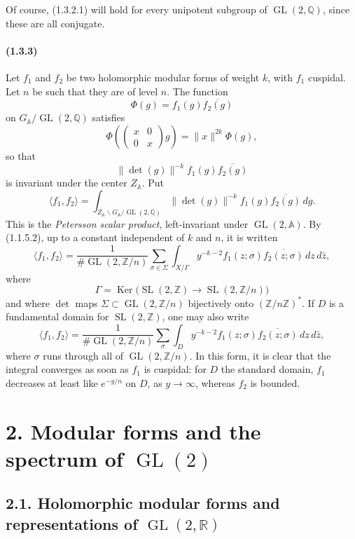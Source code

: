 \documentclass[10pt,a4paper]{article}
\providecommand{\GL}{\operatorname{GL}}
\providecommand{\SL}{\operatorname{SL}}
\providecommand{\Ker}{\operatorname{Ker}}
\providecommand{\R}{\mathbb R}
\providecommand{\Q}{\mathbb Q}
\providecommand{\Z}{\mathbb Z}
\begin{document}
\clearpage
{}
\hypertarget{authority-21}{}
Of course, (1.3.2.1) will hold for every unipotent subgroup of \(\GL(2,\Q)\), since these are all conjugate.

\paragraph{(1.3.3)} Let \(f_1\) and \(f_2\) be two holomorphic modular forms of weight \(k\), with \(f_1\) cuspidal. Let \(n\) be such that they are of level \(n\). The function
\[
\Phi(g)=f_1(g)\overline{f_2(g)}
\]
on \(G_{\mathbb A}/\GL(2,\Q)\) satisfies
\[
\Phi\!\left(\begin{pmatrix}x&0\\0&x\end{pmatrix}g\right)=\|x\|^{2k}\Phi(g),
\]
so that
\[
\|\det(g)\|^{-k}f_1(g)\overline{f_2(g)}
\]
is invariant under the center \(Z_{\mathbb A}\). Put
\[
\langle f_1,f_2\rangle
=
\int_{Z_{\mathbb A}\backslash G_{\mathbb A}/\GL(2,\Q)}
\|\det(g)\|^{-k}f_1(g)\overline{f_2(g)}\,dg.
\]
This is the \emph{Petersson scalar product}, left-invariant under \(\GL(2,\mathbb A)\). By (1.1.5.2), up to a constant independent of \(k\) and \(n\), it is written
\[
\langle f_1,f_2\rangle
=
\frac1{\#\GL(2,\Z/n)}
\sum_{\sigma\in\Sigma}
\int_{X/\Gamma}
y^{-k-2}f_1(z;\sigma)\overline{f_2(z;\sigma)}\,dz\,d\bar z,
\]
where
\[
\Gamma=\Ker\bigl(\SL(2,\Z)\longrightarrow\SL(2,\Z/n)\bigr)
\]
and where \(\det\) maps \(\Sigma\subset\GL(2,\Z/n)\) bijectively onto \((\Z/n\Z)^*\). If \(D\) is a fundamental domain for \(\SL(2,\Z)\), one may also write
\[
\langle f_1,f_2\rangle
=
\frac1{\#\GL(2,\Z/n)}
\sum_{\sigma}
\int_D
y^{-k-2}f_1(z;\sigma)\overline{f_2(z;\sigma)}\,dz\,d\bar z,
\]
where \(\sigma\) runs through all of \(\GL(2,\Z/n)\). In this form, it is clear that the integral converges as soon as \(f_1\) is cuspidal: for \(D\) the standard domain, \(f_1\) decreases at least like \(e^{-y/n}\) on \(D\), as \(y\to\infty\), whereas \(f_2\) is bounded.

\clearpage
{}
\hypertarget{authority-22}{}
\section*{2. Modular forms and the spectrum of \(\GL(2)\)}

\subsection*{2.1. Holomorphic modular forms and representations of \(\GL(2,\R)\)}
\end{document}
